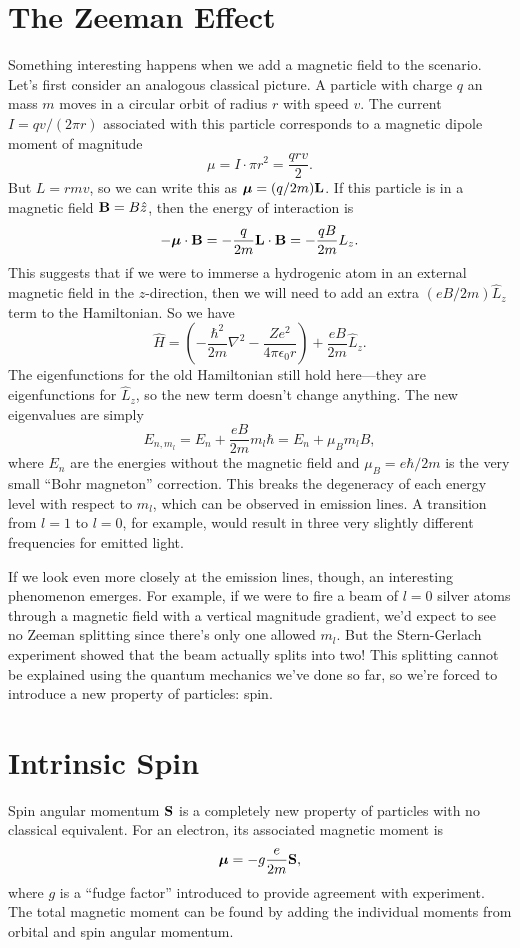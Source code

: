 \documentclass[../p052main.tex]{subfiles}
\begin{document}
\section{The Zeeman Effect}
Something interesting happens when we add a magnetic field to the scenario.
Let's first consider an analogous classical picture.
A particle with charge $q$ an mass $m$ moves in a circular orbit of radius $r$ with speed $v$.
The current $I = qv / (2\pi r)$ associated with this particle corresponds to a magnetic dipole moment of magnitude
\[ \mu = I \cdot \pi r^2 = \frac{qrv}{2}. \]
But $L = rmv$, so we can write this as $\boldsymbol\mu = (q / 2m) \mathbf{L}$.
If this particle is in a magnetic field $\mathbf{B} = B \hat z$, then the energy of interaction is
\[ -\boldsymbol\mu \cdot \mathbf{B} = -\frac{q}{2m} \mathbf{L} \cdot \mathbf{B} = -\frac{qB}{2m}L_z. \]
This suggests that if we were to immerse a hydrogenic atom in an external magnetic field in the $z$-direction, then we will need to add an extra $(eB / 2m) \hat L_z$ term to the Hamiltonian.
So we have
\[ \hat H = \left( -\frac{\hbar^2}{2m} \nabla^2 - \frac{Ze^2}{4\pi \epsilon_0 r} \right) + \frac{eB}{2m} \hat L_z. \]
The eigenfunctions for the old Hamiltonian still hold here---they are eigenfunctions for $\hat L_z$, so the new term doesn't change anything.
The new eigenvalues are simply
\[ E_{n,m_l} = E_n + \frac{eB}{2m} m_l \hbar = E_n + \mu_B m_l B, \]
where $E_n$ are the energies without the magnetic field and $\mu_B = e\hbar / 2m$ is the very small ``Bohr magneton'' correction.
This breaks the degeneracy of each energy level with respect to $m_l$, which can be observed in emission lines.
A transition from $l=1$ to $l=0$, for example, would result in three very slightly different frequencies for emitted light.

If we look even more closely at the emission lines, though, an interesting phenomenon emerges.
For example, if we were to fire a beam of $l=0$ silver atoms through a magnetic field with a vertical magnitude gradient, we'd expect to see no Zeeman splitting since there's only one allowed $m_l$.
But the Stern-Gerlach experiment showed that the beam actually splits into two!
This splitting cannot be explained using the quantum mechanics we've done so far, so we're forced to introduce a new property of particles: spin.

\section{Intrinsic Spin}
Spin angular momentum $\mathbf{S}$ is a completely new property of particles with no classical equivalent.
For an electron, its associated magnetic moment is
\[ \boldsymbol\mu = -g \frac{e}{2m} \mathbf{S}, \]
where $g$ is a ``fudge factor'' introduced to provide agreement with experiment.
The total magnetic moment can be found by adding the individual moments from orbital and spin angular momentum.
\end{document}
